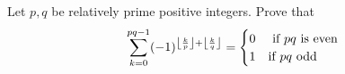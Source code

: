 Let \(\displaystyle{p,q}\) be relatively prime positive integers. Prove that
\[\displaystyle{ \sum_{k=0}^{pq-1} (-1)^{\left\lfloor \frac{k}{p}\right\rfloor + \left\lfloor \frac{k}{q}\right\rfloor}  = \begin{cases} 0 & \textnormal{ if } pq  \textnormal{ is even}\\ 1 &  \textnormal{if } pq \textnormal{  odd}\end{cases}}\]

